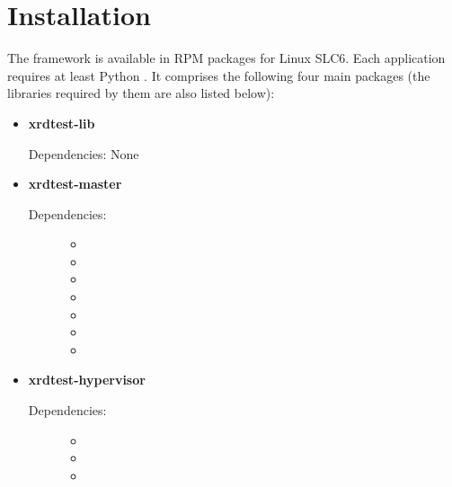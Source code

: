 \documentclass[a4paper,11pt,openany]{sphinxmanual}
\begin{document}
\section{Installation}
\label{installation:installation}\label{installation::doc}
The framework is available in RPM packages for Linux SLC6. Each application
requires at least Python . It comprises the following four main packages
(the libraries required by them are also listed below):
\begin{itemize}
\item {} 
\textbf{xrdtest-lib}

Dependencies: None

\item {} 
\textbf{xrdtest-master}
\begin{description}
\item[{Dependencies:}] \leavevmode\begin{itemize}
\item {} 

\item {} 

\item {} 

\item {} 

\item {} 

\item {} 

\item {} 

\end{itemize}

\end{description}

\item {} 
\textbf{xrdtest-hypervisor}
\begin{description}
\item[{Dependencies:}] \leavevmode\begin{itemize}
\item {} 

\item {} 

\item {} 

\end{itemize}


\end{description}
\end{itemize}
\end{document}
